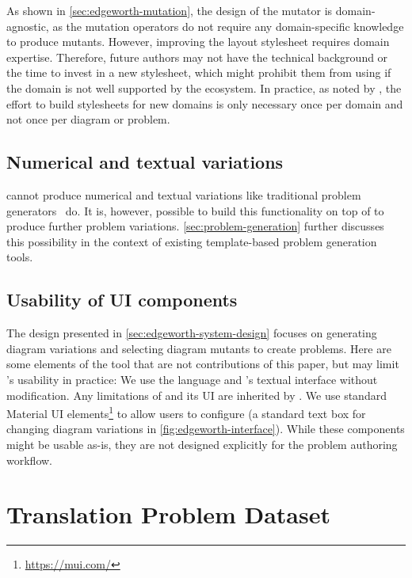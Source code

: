 As shown in \cref{sec:edgeworth-mutation}, the design of the \Edgeworth mutator is domain-agnostic, as the mutation operators do not require any domain-specific knowledge to produce mutants. However, improving the layout stylesheet requires domain expertise. Therefore, future \Edgeworth authors may not have the technical background or the time to invest in a new \Penrose stylesheet, which might prohibit them from using \Edgeworth if the domain is not well supported by the \Penrose ecosystem. In practice, as noted by \citet[Section~5]{penrose}, the effort to build \Penrose stylesheets for new domains is only necessary once per domain and not once per diagram or problem.

\subsection{Numerical and textual variations}

\Edgeworth cannot produce numerical and textual variations like traditional problem generators~\cite{CTAT, ASSISTment} do. It is, however, possible to build this functionality on top of \Edgeworth to produce further problem variations. \cref{sec:problem-generation} further discusses this possibility in the context of existing template-based problem generation tools.

\subsection{Usability of UI components}

The design presented in \cref{sec:edgeworth-system-design} focuses on generating diagram variations and selecting diagram mutants to create problems. Here are some elements of the \Edgeworth tool that are not contributions of this paper, but may limit \Edgeworth's usability in practice: We use the \Substance language and \Penrose's textual interface without modification. Any limitations of \Substance and its UI are inherited by \Edgeworth. We use standard Material UI elements\footnote{\url{https://mui.com/}} to allow users to configure \Edgeworth (\eg a standard text box for changing diagram variations in \cref{fig:edgeworth-interface}). While these components might be usable as-is, they are not designed explicitly for the problem authoring workflow. 


\section{Translation Problem Dataset}
\label{sec:edgeworth-case-studies}

